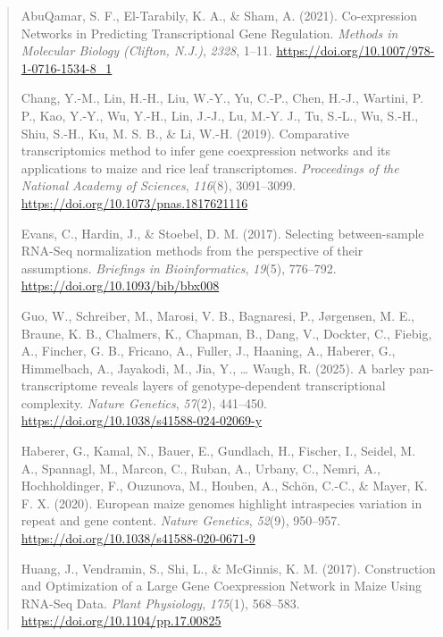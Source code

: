\documentclass[
]{article}
\begin{document}
\begin{quote}
AbuQamar, S. F., El-Tarabily, K. A., \& Sham, A. (2021). Co-expression
Networks in Predicting Transcriptional Gene Regulation. \emph{Methods in
Molecular Biology (Clifton, N.J.)}, \emph{2328}, 1--11.
\href{https://doi.org/10.1007/978-1-0716-1534-8_1}{{https://doi.org/10.1007/978-1-0716-1534-8\_1}}

Chang, Y.-M., Lin, H.-H., Liu, W.-Y., Yu, C.-P., Chen, H.-J., Wartini,
P. P., Kao, Y.-Y., Wu, Y.-H., Lin, J.-J., Lu, M.-Y. J., Tu, S.-L., Wu,
S.-H., Shiu, S.-H., Ku, M. S. B., \& Li, W.-H. (2019). Comparative
transcriptomics method to infer gene coexpression networks and its
applications to maize and rice leaf transcriptomes. \emph{Proceedings of
the National Academy of Sciences}, \emph{116}(8), 3091--3099.
\href{https://doi.org/10.1073/pnas.1817621116}{{https://doi.org/10.1073/pnas.1817621116}}

Evans, C., Hardin, J., \& Stoebel, D. M. (2017). Selecting
between-sample RNA-Seq normalization methods from the perspective of
their assumptions. \emph{Briefings in Bioinformatics}, \emph{19}(5),
776--792.
\href{https://doi.org/10.1093/bib/bbx008}{{https://doi.org/10.1093/bib/bbx008}}

Guo, W., Schreiber, M., Marosi, V. B., Bagnaresi, P., Jørgensen, M. E.,
Braune, K. B., Chalmers, K., Chapman, B., Dang, V., Dockter, C., Fiebig,
A., Fincher, G. B., Fricano, A., Fuller, J., Haaning, A., Haberer, G.,
Himmelbach, A., Jayakodi, M., Jia, Y., \ldots{} Waugh, R. (2025). A
barley pan-transcriptome reveals layers of genotype-dependent
transcriptional complexity. \emph{Nature Genetics}, \emph{57}(2),
441--450.
\href{https://doi.org/10.1038/s41588-024-02069-y}{{https://doi.org/10.1038/s41588-024-02069-y}}

Haberer, G., Kamal, N., Bauer, E., Gundlach, H., Fischer, I., Seidel, M.
A., Spannagl, M., Marcon, C., Ruban, A., Urbany, C., Nemri, A.,
Hochholdinger, F., Ouzunova, M., Houben, A., Schön, C.-C., \& Mayer, K.
F. X. (2020). European maize genomes highlight intraspecies variation in
repeat and gene content. \emph{Nature Genetics}, \emph{52}(9), 950--957.
\href{https://doi.org/10.1038/s41588-020-0671-9}{{https://doi.org/10.1038/s41588-020-0671-9}}

Huang, J., Vendramin, S., Shi, L., \& McGinnis, K. M. (2017).
Construction and Optimization of a Large Gene Coexpression Network in
Maize Using RNA-Seq Data. \emph{Plant Physiology}, \emph{175}(1),
568--583.
\href{https://doi.org/10.1104/pp.17.00825}{{https://doi.org/10.1104/pp.17.00825}}


\end{quote}
\end{document}
